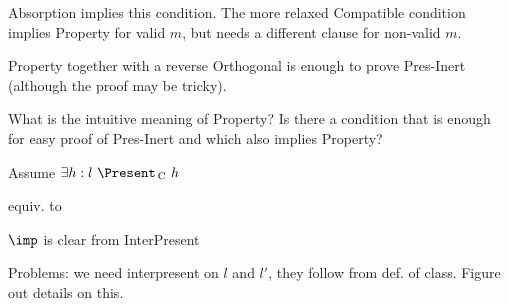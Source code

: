 {\sc Absorption} implies this condition. The more relaxed {\sc Compatible} condition implies {\sc Property} for valid $m$, but needs a different clause for non-valid $m$.

{\sc Property} together with a reverse {\sc Orthogonal} is enough to prove {\sc Pres-Inert} (although the proof may be tricky).

What is the intuitive meaning of {\sc Property}? Is there a condition that is enough for easy proof of {\sc Pres-Inert} and which also implies {\sc Property}?


Assume $\exists h: l~\Present\C~h$


equiv. to


$\imp$ is clear from {\sc InterPresent}

Problems: we need interpresent on $l$ and $l'$, they follow from def. of class. Figure out details on this. 

